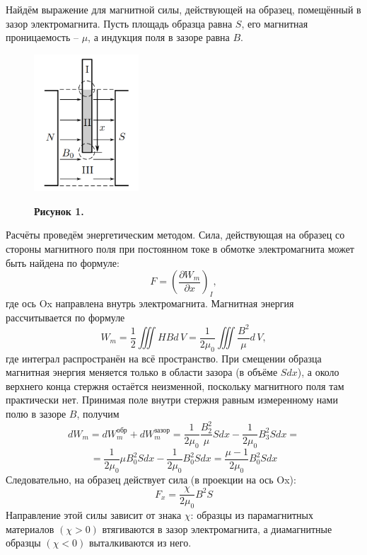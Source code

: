 \documentclass[15pt,a5paper,reqno]{article}
\begin{document}
    Найдём выражение для магнитной силы, действующей на образец, помещённый в зазор электромагнита. Пусть площадь образца равна $S$, его магнитная проницаемость -- $\mu$, а индукция поля в зазоре равна $B$.

    
    \begin{figure}
        \includegraphics[width = 0.35\textwidth]{images/stick.png}
        \begin{center}
            \textbf{Рисунок 1.}
        \end{center}
    \end{figure}
    Расчёты проведём энергетическим методом. Сила, действующая на образец со стороны магнитного поля при постоянном токе в обмотке электромагнита может быть найдена по формуле:
    \begin{equation*}
        F = \left(\frac{\partial W_m}{\partial x}\right)_I,
    \end{equation*}
    где ось Ox направлена внутрь электромагнита. Магнитная энергия рассчитывается по формуле
    \begin{equation*}
    W_m=\frac{1}{2}\iiint HBd\,V = \frac{1}{2\mu_0}\iiint\frac{B^2}{\mu}d\,V,
    \end{equation*}
    где интеграл распространён на всё пространство. При смещении образца магнитная энергия меняется только в области зазора (в объёме $Sdx$), а около верхнего конца стержня остаётся неизменной, поскольку магнитного поля там практически нет. Принимая поле внутри стержня равным измеренному нами полю в зазоре $ B $, получим
    \[dW_m = dW_m^{\text{обр}} + dW_m^{зазор} = \frac{1}{2\mu_0}\frac{B_2^2}{\mu}Sdx - \frac{1}{2\mu_0}B_3^2 Sdx = \]
    \[= \frac{1}{2\mu_0}\mu B_0^2Sdx - \frac{1}{2\mu_0}B_0^2 Sdx = \frac{\mu - 1}{2\mu_0}B_0^2Sdx\]
    Следовательно, на образец действует сила (в проекции на ось Ox):
    \begin{equation}\label{force}
    \boxed{F_x = \frac{\chi}{2\mu_0}B^2S}
    \end{equation}
    Направление этой силы зависит от знака $\chi$: образцы из парамагнитных материалов $( \chi > 0)$ втягиваются в зазор электромагнита, а диамагнитные образцы $(\chi < 0)$ выталкиваются из него.
    
\end{document}
